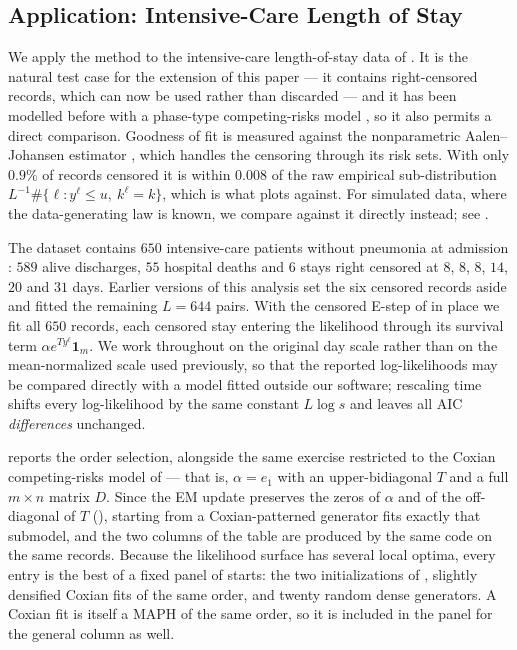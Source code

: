 \documentclass{article}
\newenvironment{rcrevision}{}{}
\newcommand{\aachg}[1]{#1}
\newcommand{\subchg}[1]{#1}
\begin{document}
\begin{rcrevision}
\subsection{Application: Intensive-Care Length of Stay}
\label{sec:realdata}
\end{rcrevision}

\begin{rcrevision}
We apply the method to the intensive-care length-of-stay data of \citet{beyersmann_2012}. It is the natural test case for the extension of this paper --- it contains right-censored records, which can now be used rather than discarded --- and it has been modelled before with a phase-type competing-risks model \citep{lindqvist_phase-type_2022}, so it also permits a direct comparison. \aachg{Goodness of fit is measured against the nonparametric Aalen--Johansen estimator \citep{aalen_johansen_1978}, which handles the censoring through its risk sets. With only $0.9\%$ of records censored it is within $0.008$ of the raw empirical sub-distribution $L^{-1}\#\{\ell:y^\ell\le u,\ k^\ell=k\}$, which is what \Cref{fig:icu-cif} plots against.} For simulated data, where the data-generating law is known, we compare against it directly instead; see .

The dataset contains $650$ intensive-care patients without pneumonia at admission \citep[Ch.~1]{beyersmann_2012}: $589$ alive discharges, $55$ hospital deaths and $6$ stays right censored at $8$, $8$, $8$, $14$, $20$ and $31$ days. Earlier versions of this analysis set the six censored records aside and fitted the remaining $L=644$ pairs. With the censored E-step of  in place we fit all $650$ records, each censored stay entering the likelihood through its survival term $\alpha e^{Ty^\ell}\mathbf 1_m$. We work throughout on the original day scale rather than on the mean-normalized scale used previously, so that the reported log-likelihoods may be compared directly with a model fitted outside our software; rescaling time shifts every log-likelihood by the same constant $L\log s$ and leaves all AIC \aachg{{\em differences}} unchanged.

 reports the order selection, alongside the same exercise restricted to the Coxian competing-risks model of \citet{lindqvist_phase-type_2022} --- that is, $\alpha=e_1$ with an upper-bidiagonal $T$ and a full $m\times n$ matrix $D$. Since the EM update preserves the zeros of $\alpha$ and of the off-diagonal of $T$ (), starting from a Coxian-patterned generator fits exactly that submodel, and the two columns of the table are produced by the same code on the same records. \subchg{Because the likelihood surface has several local optima, every entry is the best of a fixed panel of starts:} the two initializations of , slightly densified Coxian fits of the same order, and twenty random dense generators. A Coxian fit is itself a MAPH of the same order, so it is included in the panel for the general column as well.


\end{rcrevision}
\end{document}
